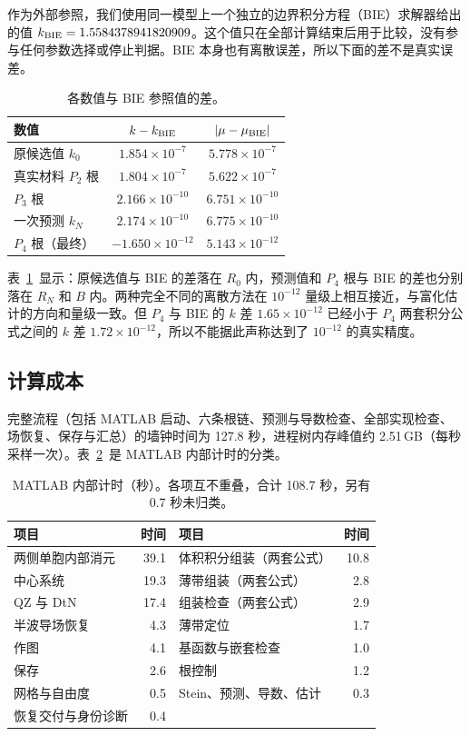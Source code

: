 \documentclass[11pt,a4paper,fontset=fandol]{ctexart}
\begin{document}
作为外部参照，我们使用同一模型上一个独立的边界积分方程（BIE）求解器给出的值 $k_{\rm BIE}=1.5584378941820909$。这个值只在全部计算结束后用于比较，没有参与任何参数选择或停止判据。BIE 本身也有离散误差，所以下面的差不是真实误差。

\begin{table}[ht]
\centering
\caption{各数值与 BIE 参照值的差。}
\label{tab:bie}
\begin{tabular}{lcc}
\toprule
数值 & $k-k_{\rm BIE}$ & $|\mu-\mu_{\rm BIE}|$ \\
\midrule
原候选值 $k_0$ & $1.854\times10^{-7}$ & $5.778\times10^{-7}$ \\
真实材料 $P_2$ 根 & $1.804\times10^{-7}$ & $5.622\times10^{-7}$ \\
$P_3$ 根 & $2.166\times10^{-10}$ & $6.751\times10^{-10}$ \\
一次预测 $k_N$ & $2.174\times10^{-10}$ & $6.775\times10^{-10}$ \\
$P_4$ 根（最终） & $-1.650\times10^{-12}$ & $5.143\times10^{-12}$ \\
\bottomrule
\end{tabular}
\end{table}

表~\ref{tab:bie}~显示：原候选值与 BIE 的差落在 $R_0$ 内，预测值和 $P_4$ 根与 BIE 的差也分别落在 $R_N$ 和 $B$ 内。两种完全不同的离散方法在 $10^{-12}$ 量级上相互接近，与富化估计的方向和量级一致。但 $P_4$ 与 BIE 的 $k$ 差 $1.65\times10^{-12}$ 已经小于 $P_4$ 两套积分公式之间的 $k$ 差 $1.72\times10^{-12}$，所以不能据此声称达到了 $10^{-12}$ 的真实精度。

\subsection{计算成本}

完整流程（包括 MATLAB 启动、六条根链、预测与导数检查、全部实现检查、场恢复、保存与汇总）的墙钟时间为 127.8 秒，进程树内存峰值约 2.51\,GB（每秒采样一次）。表~\ref{tab:timing}~是 MATLAB 内部计时的分类。

\begin{table}[ht]
\centering
\caption{MATLAB 内部计时（秒）。各项互不重叠，合计 108.7 秒，另有 0.7 秒未归类。}
\label{tab:timing}
\begin{tabular}{lr@{\hspace{3em}}lr}
\toprule
项目 & 时间 & 项目 & 时间 \\
\midrule
两侧单胞内部消元 & 39.1 & 体积积分组装（两套公式） & 10.8 \\
中心系统 & 19.3 & 薄带组装（两套公式） & 2.8 \\
QZ 与 DtN & 17.4 & 组装检查（两套公式） & 2.9 \\
半波导场恢复 & 4.3 & 薄带定位 & 1.7 \\
作图 & 4.1 & 基函数与嵌套检查 & 1.0 \\
保存 & 2.6 & 根控制 & 1.2 \\
网格与自由度 & 0.5 & Stein、预测、导数、估计 & 0.3 \\
恢复交付与身份诊断 & 0.4 & & \\
\bottomrule
\end{tabular}
\end{table}
\end{document}
